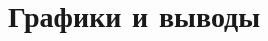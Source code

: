 \documentclass[12pt]{article}
\begin{document}
	\begin{figure}[h]
\end{figure}
	\newpage 
		\clearpage
	\section{Графики и выводы}
	
	\newpage 
		
\end{document}
